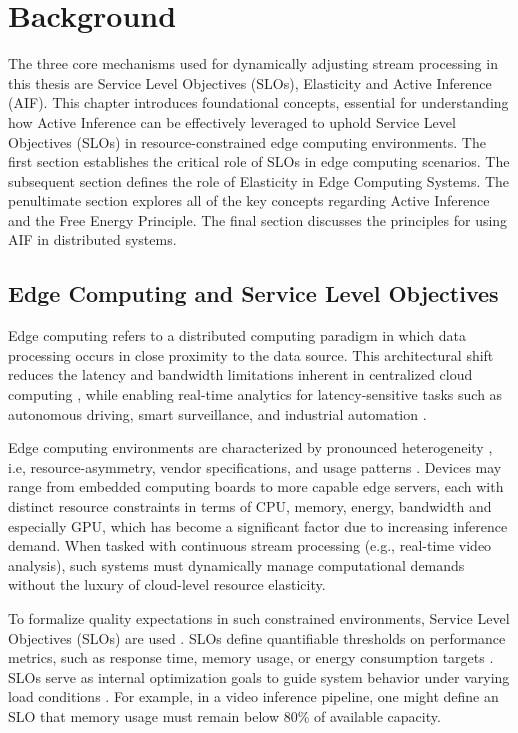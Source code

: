 \chapter{Background}
The three core mechanisms used for dynamically adjusting stream processing in this thesis are Service Level Objectives (SLOs), Elasticity and Active Inference (AIF). This chapter introduces foundational concepts, essential for understanding how Active Inference
can be effectively leveraged to uphold Service Level Objectives (SLOs) in resource-constrained
edge computing environments. The first section establishes the critical role of SLOs in edge computing scenarios. The subsequent section defines the role of Elasticity in Edge Computing Systems. The penultimate section explores all of the key concepts regarding Active Inference and the Free Energy Principle. The final section discusses the principles for using AIF in distributed systems.

\section{Edge Computing and Service Level Objectives}
Edge computing refers to a distributed computing paradigm in which data processing occurs in
close proximity to the data source. This architectural shift reduces the latency and bandwidth
limitations inherent in centralized cloud computing \cite{deng_edge_2020}, while enabling real-time
analytics for latency-sensitive tasks such as autonomous driving, smart surveillance, and
industrial automation \cite{zhang_octopus_2023}.

Edge computing environments are characterized by pronounced heterogeneity \cite{furst_elastic_2018} , i.e, resource-asymmetry, vendor specifications, and usage patterns \cite{danilenka_adaptive_2025}. Devices may range from embedded computing boards to more capable edge servers, each
with distinct resource constraints in terms of CPU, memory, energy, bandwidth and especially GPU, which has become a significant factor due to increasing inference demand. When tasked with continuous stream
processing (e.g., real-time video analysis), such systems must dynamically manage
computational demands without the luxury of cloud-level resource elasticity.

To formalize quality expectations in such constrained environments, Service Level Objectives
(SLOs) are used \cite{casamayor_pujol_deepslos_2024}. SLOs define quantifiable thresholds on performance metrics, such as
response time, memory usage, or energy consumption targets \cite{danilenka_adaptive_2025}. SLOs serve as internal optimization goals \cite{danilenka_adaptive_2025} to guide system behavior under varying load conditions \cite{nastic_sloc_2020}.
For example, in a video inference pipeline, one
might define an SLO that memory usage must remain below 80\% of available capacity.

